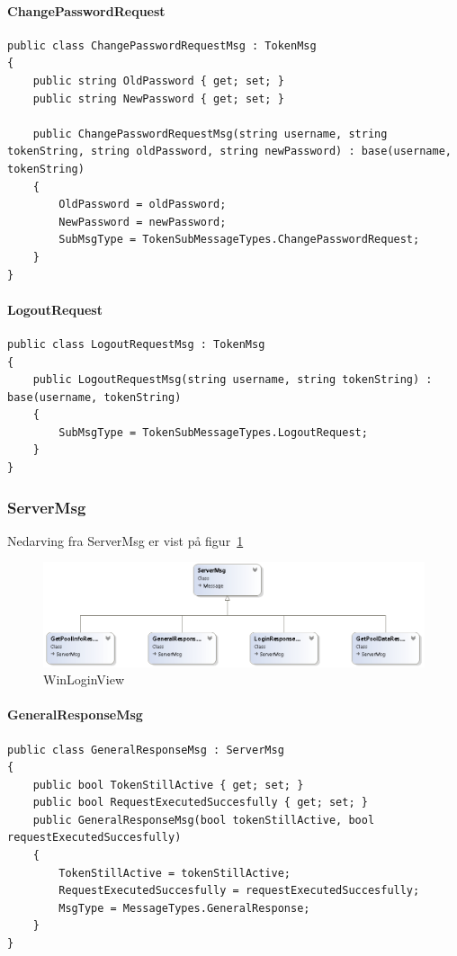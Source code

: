 \paragraph{ChangePasswordRequest}
\begin{lstlisting}[caption=ChangePasswordRequest, label=code:ChangePasswordRequest]
public class ChangePasswordRequestMsg : TokenMsg
{
	public string OldPassword { get; set; }
	public string NewPassword { get; set; }
	
	public ChangePasswordRequestMsg(string username, string tokenString, string oldPassword, string newPassword) : base(username, tokenString)
	{
		OldPassword = oldPassword;
		NewPassword = newPassword;
		SubMsgType = TokenSubMessageTypes.ChangePasswordRequest;
	}
}
\end{lstlisting}

\paragraph{LogoutRequest}
\begin{lstlisting}[caption=LogoutRequest, label=code:LogoutRequest]
public class LogoutRequestMsg : TokenMsg
{
	public LogoutRequestMsg(string username, string tokenString) : base(username, tokenString)
	{
		SubMsgType = TokenSubMessageTypes.LogoutRequest;
	}
}
\end{lstlisting}

\subsubsection{ServerMsg}
Nedarving fra ServerMsg er vist på figur~\ref{fig:ServerMsgUML}
\begin{figure}
	\centering
	\includegraphics[width=0.7\linewidth]{figs/connection/ServerMsgUML.png}
	\caption{WinLoginView}
	\label{fig:ServerMsgUML}
\end{figure}

\paragraph{GeneralResponseMsg}
\begin{lstlisting}[caption=GeneralResponseMsg, label=code:GeneralResponseMsg]
public class GeneralResponseMsg : ServerMsg
{
	public bool TokenStillActive { get; set; }
	public bool RequestExecutedSuccesfully { get; set; }
	public GeneralResponseMsg(bool tokenStillActive, bool requestExecutedSuccesfully)
	{
		TokenStillActive = tokenStillActive;
		RequestExecutedSuccesfully = requestExecutedSuccesfully;
		MsgType = MessageTypes.GeneralResponse;
	}
}
\end{lstlisting}

